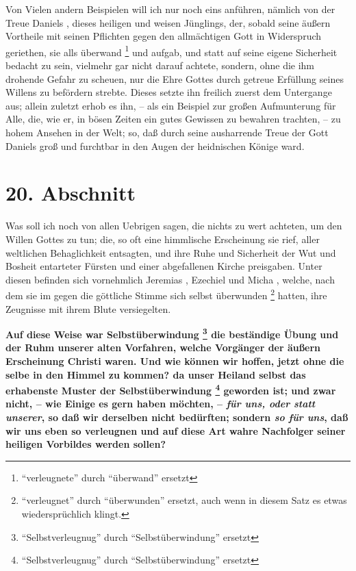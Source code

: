 Von Vielen andern Beispielen will ich nur noch eins anführen, nämlich von der
Treue Daniels , dieses heiligen  und
weisen Jünglings, der, sobald seine äußern
Vortheile mit seinen Pflichten gegen den allmächtigen Gott in Widerspruch
geriethen, sie alls überwand \footnote{"`verleugnete"' durch "`überwand"'
ersetzt} und aufgab, und statt auf seine eigene
Sicherheit bedacht zu sein, vielmehr gar nicht darauf achtete, sondern, ohne die
ihm drohende Gefahr zu scheuen, nur die Ehre Gottes durch getreue Erfüllung
seines Willens zu befördern strebte. Dieses setzte ihn freilich zuerst dem
Untergange aus; allein zuletzt erhob es ihn, -- als ein Beispiel zur großen
Aufmunterung für Alle, die, wie er, in bösen Zeiten ein gutes Gewissen zu
bewahren trachten, -- zu hohem Ansehen in der Welt; so, daß durch seine
ausharrende Treue der Gott Daniels groß und furchtbar in den Augen der
heidnischen Könige ward.

\section{20. Abschnitt} \label{kap4_ab20}

Was soll ich noch von allen Uebrigen sagen, die nichts zu wert achteten, um den
Willen Gottes zu tun; die, so oft eine himmlische Erscheinung sie rief, aller
weltlichen Behaglichkeit entsagten, und ihre Ruhe und Sicherheit der Wut und
Bosheit entarteter Fürsten und einer abgefallenen Kirche  preisgaben. Unter
diesen befinden sich vornehmlich Jeremias , Ezechiel
 und Micha , welche, nach dem
sie im gegen die göttliche Stimme sich selbst überwunden
\footnote{"`verleugnet"' durch "`überwunden"' ersetzt, auch wenn in diesem Satz
es etwas wiedersprüchlich klingt.} hatten, ihre Zeugnisse
mit ihrem Blute versiegelten.

\medskip

  \textbf{Auf diese Weise war Selbstüberwindung \footnote{"`Selbstverleugnug"' durch "`Selbstüberwindung"' ersetzt}
die beständige Übung und der Ruhm
unserer alten Vorfahren, welche Vorgänger der äußern Erscheinung Christi waren.
Und wie können wir hoffen, jetzt ohne die selbe in den Himmel  zu kommen? da
unser Heiland selbst das erhabenste Muster der Selbstüberwindung \footnote{"`Selbstverleugnug"' durch "`Selbstüberwindung"' ersetzt} geworden ist;
und zwar nicht, -- wie Einige es gern haben möchten, -- \textit{für uns, oder
statt
unserer}, so daß wir derselben nicht bedürften; sondern \textit{so für uns}, daß
wir
uns eben so verleugnen und auf diese Art wahre Nachfolger seiner heiligen
Vorbildes werden sollen?}

